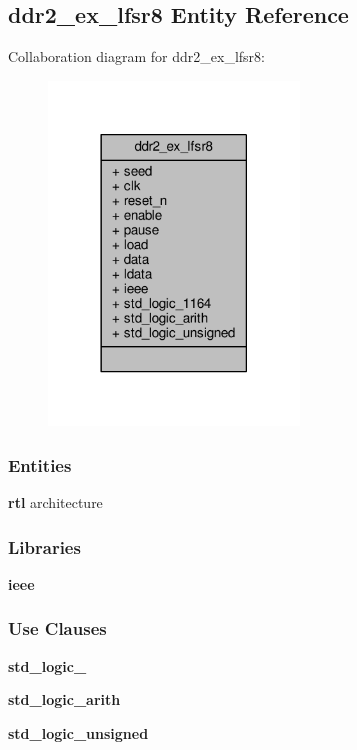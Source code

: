 \subsection{ddr2\+\_\+ex\+\_\+lfsr8 Entity Reference}
\label{classddr2__ex__lfsr8}


Collaboration diagram for ddr2\+\_\+ex\+\_\+lfsr8\+:\nopagebreak
\begin{figure}[H]
\begin{center}
\leavevmode
\includegraphics[width=189pt]{d1/d02/classddr2__ex__lfsr8__coll__graph}
\end{center}
\end{figure}
\subsubsection*{Entities}
\begin{DoxyCompactItemize}
\item 
{\bf rtl} architecture
\end{DoxyCompactItemize}
\subsubsection*{Libraries}
 \begin{DoxyCompactItemize}
\item 
{\bf ieee} 
\end{DoxyCompactItemize}
\subsubsection*{Use Clauses}
 \begin{DoxyCompactItemize}
\item 
{\bf std\+\_\+logic\+\_}   
\item 
{\bf std\+\_\+logic\+\_\+arith}   
\item 
{\bf std\+\_\+logic\+\_\+unsigned}   
\end{DoxyCompactItemize}
